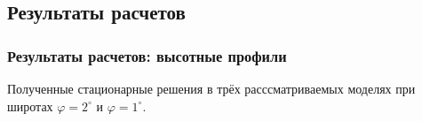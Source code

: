 \documentclass[9pt, apectratio=43,unicode]{beamer}
\begin{document}
\subsection{Результаты расчетов}
\begin{frame}\frametitle{Результаты расчетов: высотные профили}

Полученные стационарные решения в трёх расссматриваемых моделях при широтах $\varphi = 2^\circ$ и $\varphi = 1^\circ$.

\begin{figure}[H]
\begin{minipage}[c]{0.490\linewidth}
\flushleft
{}
\end{minipage}
\hfill
\begin{minipage}[c]{0.490\linewidth}
\flushleft
{}
\end{minipage}
\end{figure}

\end{frame}
\end{document}
